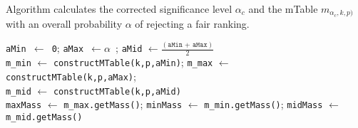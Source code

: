 \begin{algorithm}[t!]
	\caption{Algorithm \algoBinomBinary calculates the corrected significance level $\alpha_c$ and the mTable $m_{\alpha_c , k, p)}$ with an overall probability $\alpha$ of rejecting a fair ranking.}
	\label{alg:05:binarySearch} %
	\footnotesize
	\texttt{aMin $\leftarrow$ 0};
	\texttt{aMax $\leftarrow \alpha$ };
	\texttt{aMid} $\leftarrow \frac{(\texttt{aMin + aMax})}{2}$ \\
	\texttt{m\_min} $\leftarrow$ \texttt{constructMTable(k,p,aMin)}; 
	\texttt{m\_max} $\leftarrow$ \texttt{constructMTable(k,p,aMax)}; \\
	\texttt{m\_mid} $\leftarrow$ \texttt{constructMTable(k,p,aMid)} \\
	\texttt{maxMass} $\leftarrow$ \texttt{m\_max.getMass()};
	\texttt{minMass} $\leftarrow$ \texttt{m\_min.getMass()};
	\texttt{midMass} $\leftarrow$ \texttt{m\_mid.getMass()}\\
	

\end{algorithm}
